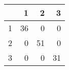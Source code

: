 \begin{tabular}{rrrr}
  \hline
 & 1 & 2 & 3 \\ 
  \hline
1 &  36 &   0 &   0 \\ 
  2 &   0 &  51 &   0 \\ 
  3 &   0 &   0 &  31 \\ 
   \hline
\end{tabular}
